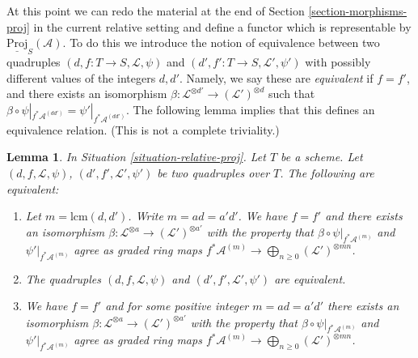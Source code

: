 \documentclass{stacks-project}
\theoremstyle{plain}
\newtheorem{lemma}[subsection]{Lemma}
\theoremstyle{definition}
\theoremstyle{remark}
\numberwithin{equation}{subsection}
\begin{document}
\noindent
At this point we can redo the material at the end of
Section \ref{section-morphisms-proj} in the current
relative setting and define a functor
which is representable by
$\underline{\text{Proj}}_S(\mathcal{A})$. To do this we introduce the
notion of equivalence between two
quadruples $(d, f : T \to S, \mathcal{L}, \psi)$ and
$(d', f' : T \to S, \mathcal{L}', \psi')$ with possibly different
values of the integers $d, d'$. Namely, we say these
are {\it equivalent} if $f = f'$, and there exists an
isomorphism $\beta : \mathcal{L}^{\otimes d'} \to (\mathcal{L}')^{\otimes d}$
such that
$\beta \circ \psi|_{f^*\mathcal{A}^{(dd')}} = \psi'|_{f^*\mathcal{A}^{(dd')}}$.
The following lemma implies that this defines an equivalence relation.
(This is not a complete triviality.)

\begin{lemma}
\label{lemma-equivalent-relative}
In Situation \ref{situation-relative-proj}.
Let $T$ be a scheme.
Let $(d, f, \mathcal{L}, \psi)$, $(d', f', \mathcal{L}', \psi')$
be two quadruples over $T$. The following are equivalent:
\begin{enumerate}
\item Let $m = \text{lcm}(d, d')$. Write $m = ad = a'd'$.
We have $f = f'$ and there exists
an isomorphism
$\beta : \mathcal{L}^{\otimes a} \to (\mathcal{L}')^{\otimes a'}$
with the property that $\beta \circ \psi|_{f^*\mathcal{A}^{(m)}}$
and $\psi'|_{f^*\mathcal{A}^{(m)}}$ agree
as graded ring maps
$f^*\mathcal{A}^{(m)} \to \bigoplus_{n \geq 0} (\mathcal{L}')^{\otimes mn}$.
\item The quadruples $(d, f, \mathcal{L}, \psi)$ and
$(d', f', \mathcal{L}', \psi')$ are equivalent.
\item We have $f = f'$ and
for some positive integer $m = ad = a'd'$ there exists an isomorphism
$\beta : \mathcal{L}^{\otimes a} \to (\mathcal{L}')^{\otimes a'}$
with the property that $\beta \circ \psi|_{f^*\mathcal{A}^{(m)}}$
and $\psi'|_{f^*\mathcal{A}^{(m)}}$ agree
as graded ring maps
$f^*\mathcal{A}^{(m)} \to \bigoplus_{n \geq 0} (\mathcal{L}')^{\otimes mn}$.
\end{enumerate}
\end{lemma}
\end{document}
